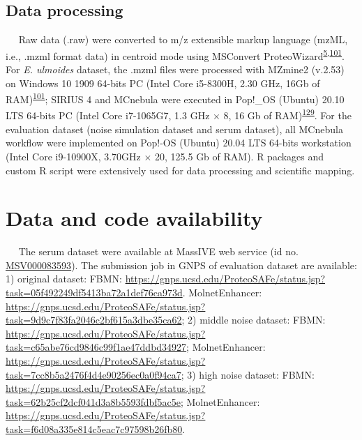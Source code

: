 \hypertarget{data-processing}{%
\subsection{\texorpdfstring{\textbf{Data
processing}}{Data processing}}\label{data-processing}}

   Raw data (.raw) were converted to m/z extensible markup language
(mzML, i.e., .mzml format data) in centroid mode using MSConvert
ProteoWizard\textsuperscript{\protect\hyperlink{ref-2012d}{5},\protect\hyperlink{ref-2011b}{101}}.
For \emph{E. ulmoides} dataset, the .mzml files were processed with
MZmine2 (v.2.53) on Windows 10 1909 64-bits PC (Intel Core i5-8300H,
2.30 GHz, 16Gb of
RAM)\textsuperscript{\protect\hyperlink{ref-2011b}{101}}; SIRIUS 4 and
MCnebula were executed in Pop!\_OS (Ubuntu) 20.10 LTS 64-bits PC (Intel
Core i7-1065G7, 1.3 GHz \(\times\) 8, 16 Gb of
RAM)\textsuperscript{\protect\hyperlink{ref-2019b}{129}}. For the
evaluation dataset (noise simulation dataset and serum dataset), all
MCnebula workflow were implemented on Pop!-OS (Ubuntu) 20.04 LTS 64-bits
workstation (Intel Core i9-10900X, 3.70GHz \(\times\) 20, 125.5 Gb of
RAM). R packages and custom R script were extensively used for data
processing and scientific mapping.

\hypertarget{data-and-code-availability}{%
\section{\texorpdfstring{\textbf{Data and code
availability}}{Data and code availability}}\label{data-and-code-availability}}

   The serum dataset were available at MassIVE web service (id no.
\href{https://massive.ucsd.edu/ProteoSAFe/QueryMSV?id=MSV000079949}{MSV000083593}).
The submission job in GNPS of evaluation dataset are available: 1)
original dataset: FBMN:
\url{https://gnps.ucsd.edu/ProteoSAFe/status.jsp?task=05f492249df5413ba72a1def76ca973d}.
MolnetEnhancer:
\url{https://gnps.ucsd.edu/ProteoSAFe/status.jsp?task=9d9c7f83fa2046c2bf615a3dbe35ca62};
2) middle noise dataset: FBMN:
\url{https://gnps.ucsd.edu/ProteoSAFe/status.jsp?task=c65abe76cd9846c99f1ae47ddbd34927};
MolnetEnhancer:
\url{https://gnps.ucsd.edu/ProteoSAFe/status.jsp?task=7cc8b5a2476f4d4e90256ec0a0f94ca7};
3) high noise dataset: FBMN:
\url{https://gnps.ucsd.edu/ProteoSAFe/status.jsp?task=62b25cf2dcf041d3a8b5593fdbf5ac5e};
MolnetEnhancer:
\url{https://gnps.ucsd.edu/ProteoSAFe/status.jsp?task=f6d08a335e814c5eac7c97598b26fb80}.

